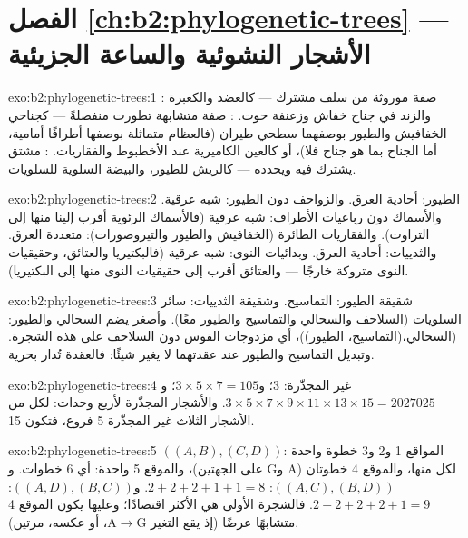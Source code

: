 \section*{الفصل \ref{ch:b2:phylogenetic-trees} --- الأشجار النشوئية والساعة الجزيئية}

\begin{solution}{exo:b2:phylogenetic-trees:1}
: صفة موروثة من سلف مشترك --- كالعضد
والكعبرة والزند في جناح خفاش وزعنفة حوت.
: صفة متشابهة تطورت منفصلةً --- كجناحي
الخفافيش والطيور بوصفهما سطحي طيران (فالعظام متماثلة بوصفها
أطرافًا أمامية، أما الجناح بما هو جناح فلا)، أو كالعين الكاميرية عند
الأخطبوط والفقاريات. :  مشتق يشترك فيه
 ويحدده --- كالريش للطيور، والبيضة السلوية
للسلويات.
\end{solution}

\begin{solution}{exo:b2:phylogenetic-trees:2}
الطيور: أحادية العرق. والزواحف دون الطيور: شبه عرقية. والأسماك
دون رباعيات الأطراف: شبه عرقية (فالأسماك الرئوية أقرب إلينا منها إلى
التراوت). والفقاريات الطائرة (الخفافيش والطيور والتيروصورات): متعددة العرق.
والثدييات: أحادية العرق. وبدائيات النوى: شبه عرقية (فالبكتيريا
والعتائق، وحقيقيات النوى متروكة خارجًا --- والعتائق أقرب إلى
حقيقيات النوى منها إلى البكتيريا).
\end{solution}

\begin{solution}{exo:b2:phylogenetic-trees:3}
شقيقة الطيور: التماسيح. وشقيقة الثدييات: سائر
السلويات (السلاحف والسحالي والتماسيح والطيور معًا). وأصغر
 يضم السحالي والطيور: (السحالي،(التماسيح، الطيور))،
أي مزدوجات القوس دون السلاحف على هذه الشجرة. وتبديل التماسيح
والطيور عند عقدتهما لا يغير شيئًا: فالعقدة تُدار بحرية.
\end{solution}

\begin{solution}{exo:b2:phylogenetic-trees:4}
غير المجذّرة: $3$؛ و$3\times 5\times 7 = 105$؛ و$3\times 5\times
7\times 9\times 11\times 13\times 15 = \num{2027025}$. والأشجار المجذّرة
لأربع وحدات: لكل من الأشجار الثلاث غير المجذّرة 5 فروع، فتكون 15.
\end{solution}

\begin{solution}{exo:b2:phylogenetic-trees:5}
$((A,B),(C,D))$: المواقع 1 و2 و3 خطوة واحدة لكل منها، والموقع 4 خطوتان
($\mathrm{A}$ و$\mathrm{G}$ على الجهتين)، والموقع 5 واحدة: أي 6 خطوات.
و$((A,C),(B,D))$: $2 + 2 + 2 + 1 + 1 = 8$. و$((A,D),(B,C))$: $2 + 2 + 2 +
2 + 1 = 9$. فالشجرة الأولى هي الأكثر اقتصادًا؛ وعليها يكون الموقع 4
متشابهًا عرضًا (إذ يقع التغير $\mathrm{A}\to\mathrm{G}$، أو عكسه،
مرتين).
\end{solution}

